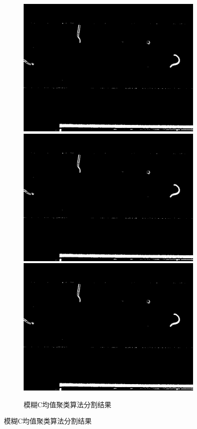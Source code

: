 \begin{figure}[!htp]
	 \begin{subfigure}{\linewidth}
		\centering
		\begin{minipage}[b]{\linewidth}
		\includegraphics[width=0.33\linewidth,natwidth=800,natheight=600]{figure/chap3/test_fcm/441.orgin.1051.jpg}
		\includegraphics[width=0.33\linewidth,natwidth=800,natheight=600]{figure/chap3/test_fcm/441.orgin.1051.jpg}
		\includegraphics[width=0.33\linewidth,natwidth=800,natheight=600]{figure/chap3/test_fcm/441.orgin.1051.jpg}
		\end{minipage}
		\caption{模糊C均值聚类算法分割结果}
	  \end{subfigure}


\end{figure}
